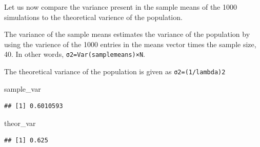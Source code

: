 \documentclass[]{article}
\newenvironment{Shaded}{\begin{snugshade}}{\end{snugshade}}
\newcommand{\KeywordTok}[1]{\textcolor[rgb]{0.13,0.29,0.53}{\textbf{{#1}}}}
\newcommand{\DecValTok}[1]{\textcolor[rgb]{0.00,0.00,0.81}{{#1}}}
\newcommand{\StringTok}[1]{\textcolor[rgb]{0.31,0.60,0.02}{{#1}}}
\newcommand{\NormalTok}[1]{{#1}}
\begin{document}
Let us now compare the variance present in the sample means of the 1000
simulations to the theoretical varience of the population.

The variance of the sample means estimates the variance of the
population by using the varience of the 1000 entries in the means vector
times the sample size, 40. In other words,
\texttt{σ2=Var(samplemeans)×N}.

\begin{Shaded}
\end{Shaded}

The theoretical variance of the population is given as
\texttt{σ2=(1/lambda)2}

\begin{Shaded}
\begin{Highlighting}[]
\NormalTok{sample_var}
\end{Highlighting}
\end{Shaded}

\begin{verbatim}
## [1] 0.6010593
\end{verbatim}

\begin{Shaded}
\begin{Highlighting}[]
\NormalTok{theor_var}
\end{Highlighting}
\end{Shaded}

\begin{verbatim}
## [1] 0.625
\end{verbatim}
\end{document}
